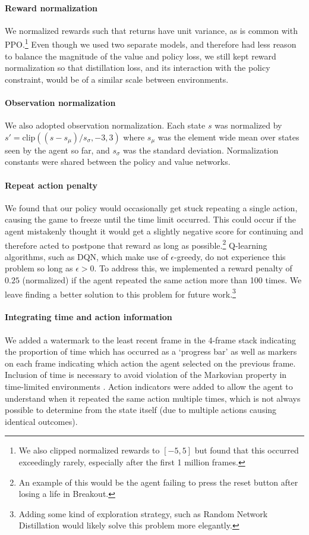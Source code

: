 \documentclass{article}
\begin{document}
\paragraph{Reward normalization} We normalized rewards such that returns have unit variance, as is common with PPO.\footnote{We also clipped normalized rewards to $[-5, 5]$ but found that this occurred exceedingly rarely, especially after the first 1 million frames.} Even though we used two separate models, and therefore had less reason to balance the magnitude of the value and policy loss, we still kept reward normalization so that distillation loss, and its interaction with the policy constraint, would be of a similar scale between environments.

\paragraph{Observation normalization} We also adopted observation normalization. Each state $s$ was normalized by $s' = \text{clip}((s - s_\mu) / s_\sigma, -3, 3)$ where $s_\mu$ was the element wide mean over states seen by the agent so far, and $s_\sigma$ was the standard deviation. Normalization constants were shared between the policy and value networks.

\paragraph{Repeat action penalty} We found that our policy would occasionally get stuck repeating a single action, causing the game to freeze until the time limit occurred. This could occur if the agent mistakenly thought it would get a slightly negative score for continuing and therefore acted to postpone that reward as long as possible.\footnote{An example of this would be the agent failing to press the reset button after losing a life in Breakout.} Q-learning algorithms, such as DQN, which make use of $\epsilon$-greedy, do not experience this problem so long as $\epsilon > 0$. To address this, we implemented a reward penalty of $0.25$ (normalized) if the agent repeated the same action more than 100 times. We leave finding a better solution to this problem for future work.\footnote{Adding some kind of exploration strategy, such as Random Network Distillation \cite{burda2018exploration} would likely solve this problem more elegantly.}

\paragraph{Integrating time and action information} We added a watermark to the least recent frame in the 4-frame stack indicating the proportion of time which has occurred as a `progress bar' as well as markers on each frame indicating which action the agent selected on the previous frame. Inclusion of time is necessary to avoid violation of the Markovian property in time-limited environments \cite{pardo2018time}. Action indicators were added to allow the agent to understand when it repeated the same action multiple times, which is not always possible to determine from the state itself (due to multiple actions causing identical outcomes).
\end{document}
